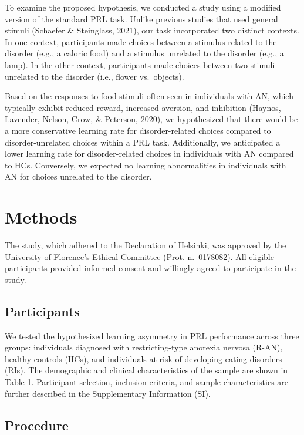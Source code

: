 \documentclass[
  man,floatsintext]{apa6}
\begin{document}
To examine the proposed hypothesis, we conducted a study using a modified version of the standard PRL task. Unlike previous studies that used general stimuli (Schaefer \& Steinglass, 2021), our task incorporated two distinct contexts. In one context, participants made choices between a stimulus related to the disorder (e.g., a caloric food) and a stimulus unrelated to the disorder (e.g., a lamp). In the other context, participants made choices between two stimuli unrelated to the disorder (i.e., flower vs.~objects).

Based on the responses to food stimuli often seen in individuals with AN, which typically exhibit reduced reward, increased aversion, and inhibition (Haynos, Lavender, Nelson, Crow, \& Peterson, 2020), we hypothesized that there would be a more conservative learning rate for disorder-related choices compared to disorder-unrelated choices within a PRL task. Additionally, we anticipated a lower learning rate for disorder-related choices in individuals with AN compared to HCs. Conversely, we expected no learning abnormalities in individuals with AN for choices unrelated to the disorder.

\hypertarget{methods}{%
\section{Methods}\label{methods}}

The study, which adhered to the Declaration of Helsinki, was approved by the University of Florence's Ethical Committee (Prot. n.~0178082). All eligible participants provided informed consent and willingly agreed to participate in the study.

\hypertarget{participants}{%
\subsection{Participants}\label{participants}}

We tested the hypothesized learning asymmetry in PRL performance across three groups: individuals diagnosed with restricting-type anorexia nervosa (R-AN), healthy controls (HCs), and individuals at risk of developing eating disorders (RIs). The demographic and clinical characteristics of the sample are shown in Table 1. Participant selection, inclusion criteria, and sample characteristics are further described in the Supplementary Information (SI).

\hypertarget{procedure}{%
\subsection{Procedure}\label{procedure}}
\end{document}
